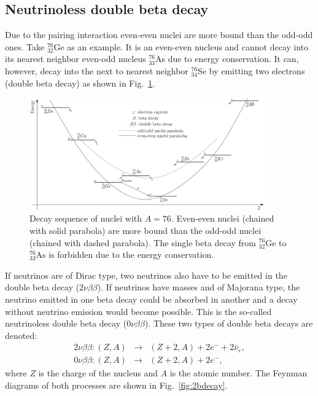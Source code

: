 \subsection{Neutrinoless double beta decay}
\label{sec:nonubb}
Due to the pairing interaction even-even nuclei are more bound than
the odd-odd ones. Take $^{76}_{32}$Ge as an example. It is an
even-even nucleus and cannot decay into its nearest neighbor even-odd
nucleus $^{76}_{33}$As due to energy conservation. It can, however,
decay into the next to nearest neighbor $^{76}_{34}$Se by emitting two
electrons (double beta decay) as shown in Fig.~\ref{fig:ee2oo}.
\begin{figure}[tbhp]
\centering
\includegraphics[width=0.9\textwidth]{Espec0nu2b}  
\caption{Decay sequence of nuclei with $A=76$. Even-even nuclei
(chained with solid parabola) are more bound than the odd-odd nuclei
(chained with dashed parabola). The single beta decay from
$^{76}_{32}$Ge to $^{76}_{33}$As is forbidden due to the energy
conservation.}
\label{fig:ee2oo}
\end{figure}
If neutrinos are of Dirac type, two neutrinos also have to be emitted
in the double beta decay ($2\nu\beta\beta$). If neutrinos have masses
and of Majorana type, the neutrino emitted in one beta decay could be
absorbed in another and a decay without neutrino emission would become
possible. This is the so-called neutrinoless double beta decay
($0\nu\beta\beta$). These two types of double beta decays are denoted:
\begin{eqnarray}
2\nu\beta\beta: (Z,A) &\rightarrow& (Z+2,A) + 2e^{-} +
2\bar{\nu}_{e}, \\\label{eq:2nu2b}
0\nu\beta\beta: (Z,A) &\rightarrow& (Z+2,A) + 2e^{-},
\label{eq:0nu2b}
\end{eqnarray}
where $Z$ is the charge of the nucleus and $A$ is the atomic number.
The Feynman diagrams of both processes are shown in
Fig.~\ref{fig:2bdecay}.
